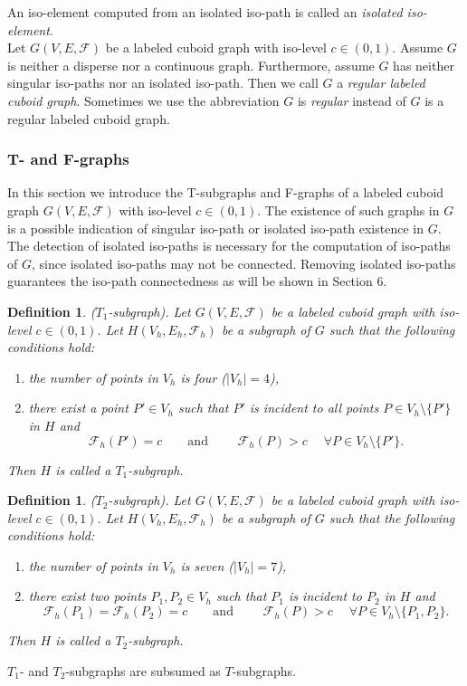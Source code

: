 \documentclass[a4paper,11pt]{article}
\newtheorem{definition}[theorem]{Definition}
\begin{document}
An iso-element computed from an isolated iso-path is called
an {\it isolated iso-element}.\\

Let $G(V,E,\mathcal{F})$ be a labeled cuboid graph
with iso-level $c\in (0,1)$. Assume $G$ is neither a disperse nor a continuous graph. Furthermore,
assume $G$ has neither singular iso-paths nor an isolated iso-path. Then we call $G$ a {\it regular
labeled cuboid graph}. Sometimes we use the abbreviation $G$ is {\it regular} instead of $G$ is a
regular labeled cuboid graph.

\subsubsection{T- and F-graphs}
In this section we introduce the T-subgraphs and F-graphs of a labeled cuboid graph $G(V,E,\mathcal{F})$
with iso-level $c\in (0,1)$. The existence of such graphs in $G$ is a possible indication of singular
iso-path or isolated iso-path existence in $G$. The detection of isolated iso-paths is necessary
for the computation of iso-paths of $G$, since isolated iso-paths may not be connected. Removing
isolated iso-paths guarantees the iso-path connectedness as will be shown in Section 6.

\begin{definition}($T_1$-subgraph). Let $G(V,E,\mathcal{F})$ be a labeled cuboid graph
with iso-level $c\in (0,1)$. Let $H(V_h,E_h,\mathcal{F}_h)$ be a subgraph of $G$ such that the following
conditions hold:
\begin{enumerate}
\item the number of points in $V_h$ is four ($|V_h|=4$),
\item there exist a point $P'\in V_h$ such that $P'$ is incident to all points $P\in V_h\setminus\{P'\}$ in $H$ and
\[
\mathcal{F}_h(P')=c\qquad\mbox{and } \qquad \mathcal{F}_h(P)>c \quad\;\forall P\in V_h\setminus\{P'\}.
\]
\end{enumerate}
Then $H$ is called a $T_1$-subgraph.
\label{def:iso-path-2}
\end{definition}

\begin{definition}($T_2$-subgraph). Let $G(V,E,\mathcal{F})$ be a labeled cuboid graph
with iso-level $c\in (0,1)$. Let $H(V_h,E_h,\mathcal{F}_h)$ be a subgraph of $G$ such that the following
conditions hold:
\begin{enumerate}
\item the number of points in $V_h$ is seven ($|V_h|=7$),
\item there exist two points $P_1,P_2\in V_h$ such that $P_1$ is incident to $P_2$ in $H$ and
\[
\mathcal{F}_h(P_1)=\mathcal{F}_h(P_2)=c\qquad\mbox{and }\qquad
\mathcal{F}_h(P)>c \quad\;\forall P\in V_h\setminus\{P_1,P_2\}.
\]
\end{enumerate}
Then $H$ is called a $T_2$-subgraph.
\label{def:iso-path-3}
\end{definition}
\noindent $T_1$- and $T_2$-subgraphs are subsumed as $T$-subgraphs.
\end{document}
